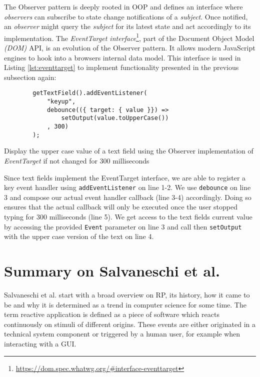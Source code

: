 \documentclass[12pt,a4paper]{article}
\begin{document}
The Observer pattern \cite{gamma1995design} is deeply rooted in OOP and defines an interface where \emph{observers} can subscribe to state change notifications of a \emph{subject}. Once notified, an \emph{observer} might query the \emph{subject} for its latest state and act accordingly to its implementation. The \emph{EventTarget interface}\footnote{\url{https://dom.spec.whatwg.org/\#interface-eventtarget}}, part of the Document Object Model \emph{(DOM)} API, is an evolution of the Observer pattern. It allows modern JavaScript engines to hook into a browsers internal data model. This interface is used in Listing \ref{lst:eventtarget} to implement functionality presented in the previous subsection again:

\begin{listing}[H]
	\begin{verbatim}
		getTextField().addEventListener(
			"keyup",
			debounce(({ target: { value }}) =>
				setOutput(value.toUpperCase())
			, 300)
		);
	\end{verbatim}
	\caption{Display the upper case value of a text field using the Observer implementation of \emph{EventTarget} if not changed for 300 milliseconds}
	\label{lst:eventtarget}
\end{listing}

Since text fields implement the EventTarget interface, we are able to register a key event handler using \texttt{addEventListener} on line 1-2. We use \texttt{debounce} on line 3 and compose our actual event handler callback (line 3-4) accordingly. Doing so ensures that the actual callback will only be executed once the user stopped typing for 300 milliseconds (line 5). We get access to the text fields current value by accessing the provided \texttt{Event} parameter on line 3 and call then \texttt{setOutput} with the upper case version of the text on line 4.

\section{Summary on Salvaneschi et al.}
\label{sec:summary}

Salvaneschi et al. start with a broad overview on RP, its history, how it came to be and why it is determined as a trend in computer science for some time. The term reactive application is defined as a piece of software which reacts continuously on stimuli of different origins. These events are either originated in a technical system component or triggered by a human user, for example when interacting with a GUI.
\end{document}
